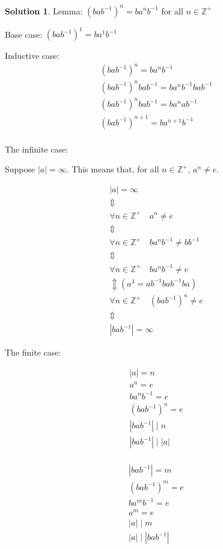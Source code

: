 \documentclass[12pt]{article}
\theoremstyle{definition}
\newtheorem*{soln}{Solution}
\newcommand{\ZZ}{{\mathbb{Z}}}
\begin{document}
\begin{soln}\quad

Lemma: $(bab^{-1})^n=ba^nb^{-1}$ for all $n\in\ZZ^+$

Base case: $(bab^{-1})^1=ba^1b^{-1}$

Inductive case:
\begin{gather*}
(bab^{-1})^n=ba^nb^{-1}\\
(bab^{-1})^nbab^{-1}=ba^nb^{-1}bab^{-1}\\
(bab^{-1})^nbab^{-1}=ba^nab^{-1}\\
(bab^{-1})^{n+1}=ba^{n+1}b^{-1}\\
\end{gather*}

The infinite case:

Suppose $|a|=\infty$.
This means that, for all $n\in\ZZ^+$, $a^n\neq e$.

\begin{gather*}
|a|=\infty\\
\Updownarrow\\
\forall n\in\ZZ^+\quad a^n\neq e\\
\Updownarrow\\
\forall n\in\ZZ^+\quad ba^nb^{-1}\neq bb^{-1}\\
\Updownarrow\\
\forall n\in\ZZ^+\quad ba^nb^{-1}\neq e\\
\Updownarrow (a^3=ab^{-1}bab^{-1}ba)\\
\forall n\in\ZZ^+\quad (bab^{-1})^n\neq e\\
\Updownarrow\\
|bab^{-1}|=\infty
\end{gather*}

The finite case:

\begin{gather*}
\left|a\right|=n\\
a^n=e\\
ba^nb^{-1}=e\\
(bab^{-1})^n=e\\
\left|bab^{-1}\right|\mid n\\
\left|bab^{-1}\right|\mid \left|a\right|\\
\end{gather*}

\begin{gather*}
\left|bab^{-1}\right|=m\\
(bab^{-1})^m=e\\
ba^mb^{-1}=e\\
a^m=e\\
\left|a\right| \mid m\\
\left|a\right| \mid \left|bab^{-1}\right|\\
\end{gather*}


\end{soln}
\end{document}
